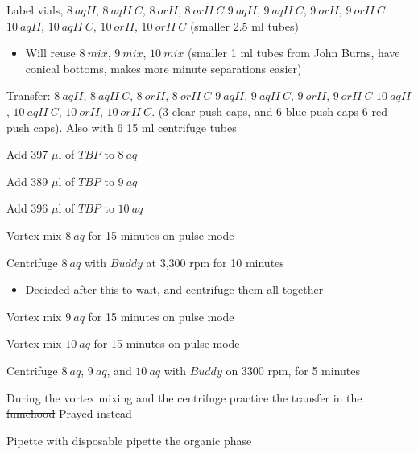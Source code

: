 \documentclass[idxtotoc,hyperref,openany,oneside]{labbook} %
\newcommand{\cmark}{\ding{51}}%
\newcommand{\done}{\rlap{$\square$}{\raisebox{2pt}{\large\hspace{1pt}\cmark}}%
  \hspace{-2.5pt}}
\begin{document}
\begin{todolist}
\item[\done]{Label vials,
  $\boxed{8\ aqII}$,  $\boxed{8\ aqII\ C}$,  $\boxed{8\ orII}$,
  $\boxed{8\ orII\ C}$
  $\boxed{9\ aqII}$,  $\boxed{9\ aqII\ C}$,  $\boxed{9\ orII}$,
  $\boxed{9\ orII\ C}$
  $\boxed{10\ aqII}$, $\boxed{10\ aqII\ C}$, $\boxed{10\ orII}$,
  $\boxed{10\ orII\ C}$ (smaller 2.5 ml tubes)}
  \begin{itemize}
  \item{Will reuse $\boxed{8\ mix}$, $\boxed{9\ mix}$,
    $\boxed{10\ mix}$ (smaller 1 ml tubes from John Burns,
    have conical bottoms, makes more minute separations easier)}
  \end{itemize}
  
\item[\done]{Transfer:
  $\boxed{8\ aqII}$,  $\boxed{8\ aqII\ C}$,  $\boxed{8\ orII}$,
  $\boxed{8\ orII\ C}$
  $\boxed{9\ aqII}$,  $\boxed{9\ aqII\ C}$,  $\boxed{9\ orII}$,
  $\boxed{9\ orII\ C}$
  $\boxed{10\ aqII}$, $\boxed{10\ aqII\ C}$, $\boxed{10\ orII}$,
  $\boxed{10\ orII\ C}$.
  (3 clear push caps, and 6 blue push caps
  6 red push caps). Also with 6 15 ml centrifuge tubes}
\item[\done]{Add 397 $\mu$l of $\boxed{TBP}$ to $\boxed{8\ aq}$}
\item[\done]{Add 389 $\mu$l of $\boxed{TBP}$ to $\boxed{9\ aq}$}
\item[\done]{Add 396 $\mu$l of $\boxed{TBP}$ to $\boxed{10\ aq}$}
\item[\done]{Vortex mix $\boxed{8\ aq}$ for 15 minutes on pulse mode}
\item[\done]{Centrifuge $\boxed{8\ aq}$ with $\boxed{Buddy}$ at 3,300
  rpm for 10 minutes}
  \begin{itemize}
  \item{Decieded after this to wait, and centrifuge them all together}
  \end{itemize}
\item[\done]{Vortex mix $\boxed{9\ aq}$ for 15 minutes on pulse mode}
\item[\done]{Vortex mix $\boxed{10\ aq}$ for 15 minutes on pulse mode}
\item[\done]{Centrifuge $\boxed{8\ aq}$, $\boxed{9\ aq}$,
  and $\boxed{10\ aq}$
  with $\boxed{Buddy}$ on 3300 rpm, for 5 minutes}
\item{\st{During the vortex mixing and the centrifuge
  practice the transfer in the fumehood} Prayed instead}
\item[\done]{Pipette with disposable pipette the organic phase
}
\end{todolist}
\end{document}
